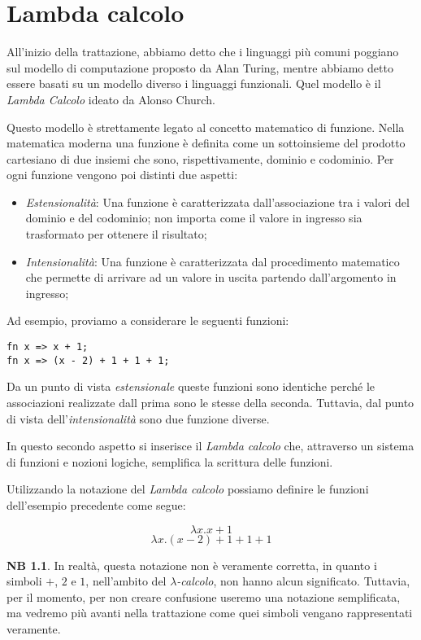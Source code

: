 \documentclass[12pt, a4paper]{report}
\theoremstyle{definition}
\newtheorem*{note}{NB}
\begin{document}
\chapter{Lambda calcolo}
All'inizio della trattazione, abbiamo detto che i linguaggi più comuni poggiano
sul modello di computazione proposto da Alan Turing, mentre abbiamo detto essere
basati su un modello diverso i linguaggi funzionali. Quel modello è il
\emph{Lambda Calcolo} ideato da Alonso Church.

Questo modello è strettamente legato al concetto matematico di funzione. Nella
matematica moderna una funzione è definita come un sottoinsieme del prodotto
cartesiano di due insiemi che sono, rispettivamente, dominio e codominio.
Per ogni funzione vengono poi distinti due aspetti:
\begin{itemize}
    \item \emph{Estensionalità}: Una funzione è caratterizzata dall'associazione
    tra i valori del dominio e del codominio; non importa come il valore in ingresso
    sia trasformato per ottenere il risultato;
    \item \emph{Intensionalità}: Una funzione è caratterizzata dal procedimento
    matematico che permette di arrivare ad un valore in uscita partendo
    dall'argomento in ingresso;
\end{itemize}
Ad esempio, proviamo a considerare le seguenti funzioni:
\begin{lstlisting}
fn x => x + 1;
fn x => (x - 2) + 1 + 1 + 1;
\end{lstlisting}
Da un punto di vista \emph{estensionale} queste funzioni sono identiche perché
le associazioni realizzate dall prima sono le stesse della seconda. Tuttavia,
dal punto di vista dell'\emph{intensionalità} sono due funzione diverse.

In questo secondo aspetto si inserisce il \emph{Lambda calcolo} che, attraverso
un sistema di funzioni e nozioni logiche, semplifica la scrittura delle funzioni.

Utilizzando la notazione del \emph{Lambda calcolo} possiamo definire le funzioni
dell'esempio precedente come segue:

\[\lambda x.x+1\]
\[\lambda x.(x-2)+1+1+1\]

\begin{note}
    In realtà, questa notazione non è veramente corretta, in quanto i simboli
    $+$, $2$ e $1$, nell'ambito del \emph{$\lambda$-calcolo}, non hanno alcun
    significato. Tuttavia, per il momento, per non creare confusione useremo una
    notazione semplificata, ma vedremo più avanti nella trattazione come quei
    simboli vengano rappresentati veramente.
\end{note}
\end{document}

